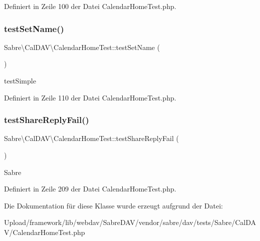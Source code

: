 Definiert in Zeile 100 der Datei Calendar\+Home\+Test.\+php.

\mbox{\label{class_sabre_1_1_cal_d_a_v_1_1_calendar_home_test_a6be08128ae7a4d254fd42b5cb4b4782f}} 
\subsubsection{\texorpdfstring{test\+Set\+Name()}{testSetName()}}
{\footnotesize\ttfamily Sabre\textbackslash{}\+Cal\+D\+A\+V\textbackslash{}\+Calendar\+Home\+Test\+::test\+Set\+Name (\begin{DoxyParamCaption}{ }\end{DoxyParamCaption})}

test\+Simple 

Definiert in Zeile 110 der Datei Calendar\+Home\+Test.\+php.

\mbox{\label{class_sabre_1_1_cal_d_a_v_1_1_calendar_home_test_a28111b39aecc9693ef1e5a568d0110fe}} 
\subsubsection{\texorpdfstring{test\+Share\+Reply\+Fail()}{testShareReplyFail()}}
{\footnotesize\ttfamily Sabre\textbackslash{}\+Cal\+D\+A\+V\textbackslash{}\+Calendar\+Home\+Test\+::test\+Share\+Reply\+Fail (\begin{DoxyParamCaption}{ }\end{DoxyParamCaption})}

Sabre 

Definiert in Zeile 209 der Datei Calendar\+Home\+Test.\+php.



Die Dokumentation für diese Klasse wurde erzeugt aufgrund der Datei\+:\begin{DoxyCompactItemize}
\item 
Upload/framework/lib/webdav/\+Sabre\+D\+A\+V/vendor/sabre/dav/tests/\+Sabre/\+Cal\+D\+A\+V/Calendar\+Home\+Test.\+php\end{DoxyCompactItemize}
